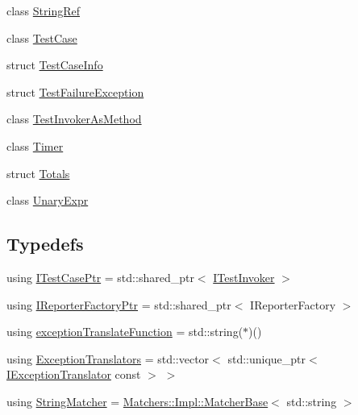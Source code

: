 \begin{DoxyCompactItemize}
\item 
class \mbox{\hyperlink{class_catch_1_1_string_ref}{String\+Ref}}
\item 
class \mbox{\hyperlink{class_catch_1_1_test_case}{Test\+Case}}
\item 
struct \mbox{\hyperlink{struct_catch_1_1_test_case_info}{Test\+Case\+Info}}
\item 
struct \mbox{\hyperlink{struct_catch_1_1_test_failure_exception}{Test\+Failure\+Exception}}
\item 
class \mbox{\hyperlink{class_catch_1_1_test_invoker_as_method}{Test\+Invoker\+As\+Method}}
\item 
class \mbox{\hyperlink{class_catch_1_1_timer}{Timer}}
\item 
struct \mbox{\hyperlink{struct_catch_1_1_totals}{Totals}}
\item 
class \mbox{\hyperlink{class_catch_1_1_unary_expr}{Unary\+Expr}}
\end{DoxyCompactItemize}
\subsection*{Typedefs}
\begin{DoxyCompactItemize}
\item 
using \mbox{\hyperlink{namespace_catch_afa04ebe8e9423240c9585f7101a82ddf}{I\+Test\+Case\+Ptr}} = std\+::shared\+\_\+ptr$<$ \mbox{\hyperlink{struct_catch_1_1_i_test_invoker}{I\+Test\+Invoker}} $>$
\item 
using \mbox{\hyperlink{namespace_catch_ad1b36ac40c2739e52fd453dcdddf0d09}{I\+Reporter\+Factory\+Ptr}} = std\+::shared\+\_\+ptr$<$ I\+Reporter\+Factory $>$
\item 
using \mbox{\hyperlink{namespace_catch_ae8d8673884dc36b98875106322a2a37b}{exception\+Translate\+Function}} = std\+::string($\ast$)()
\item 
using \mbox{\hyperlink{namespace_catch_a7ad07967e688fdc03cf784f58be4b741}{Exception\+Translators}} = std\+::vector$<$ std\+::unique\+\_\+ptr$<$ \mbox{\hyperlink{struct_catch_1_1_i_exception_translator}{I\+Exception\+Translator}} const  $>$ $>$
\item 
using \mbox{\hyperlink{namespace_catch_aba438977e831821a2eeca82b9b4f4af2}{String\+Matcher}} = \mbox{\hyperlink{struct_catch_1_1_matchers_1_1_impl_1_1_matcher_base}{Matchers\+::\+Impl\+::\+Matcher\+Base}}$<$ std\+::string $>$
\end{DoxyCompactItemize}
